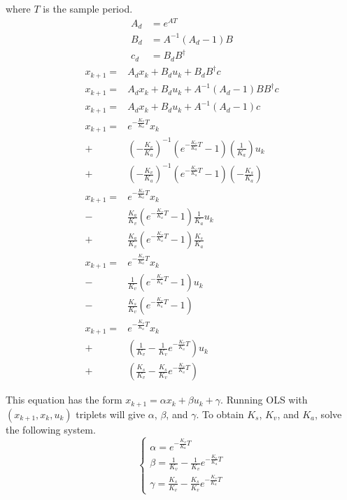 \documentclass[10pt,conference,compsoc]{IEEEtran}
\begin{document}
where $T$ is the sample period.
\begin{align*}
  A_d &= e^{AT} \\
  B_d &= A^{-1} (A_d - 1) B \\
  c_d &= B_d B^\dagger
\end{align*}
\begin{equation*}
  \begin{aligned}
    x_{k+1} =& A_d x_k + B_d u_k + B_d B^\dagger c \\
    x_{k+1} =& A_d x_k + B_d u_k + A^{-1} (A_d - 1) B B^\dagger c \\
    x_{k+1} =& A_d x_k + B_d u_k + A^{-1} (A_d - 1) c \\
    x_{k+1} =& e^{-\frac{K_v}{K_a} T} x_k \\
      +& \left(-\frac{K_v}{K_a}\right)^{-1}
        \left(e^{-\frac{K_v}{K_a} T} - 1\right)
        \left(\frac{1}{K_a}\right) u_k \\
      +& \left(-\frac{K_v}{K_a}\right)^{-1}
        \left(e^{-\frac{K_v}{K_a} T} - 1\right)
        \left(-\frac{K_s}{K_a}\right) \\
    x_{k+1} =& e^{-\frac{K_v}{K_a} T} x_k \\
      -& \frac{K_a}{K_v}
        \left(e^{-\frac{K_v}{K_a} T} - 1\right)
        \frac{1}{K_a} u_k \\
      +& \frac{K_a}{K_v}
        \left(e^{-\frac{K_v}{K_a} T} - 1\right)
        \frac{K_s}{K_a} \\
    x_{k+1} =& e^{-\frac{K_v}{K_a} T} x_k \\
      -& \frac{1}{K_v}
        \left(e^{-\frac{K_v}{K_a} T} - 1\right) u_k \\
      -& \frac{K_s}{K_v}
        \left(e^{-\frac{K_v}{K_a} T} - 1\right) \\
    x_{k+1} =& e^{-\frac{K_v}{K_a} T} x_k \\
      +& \left(\frac{1}{K_v} - \frac{1}{K_v}e^{-\frac{K_v}{K_a} T}\right) u_k \\
      +& \left(\frac{K_s}{K_v} - \frac{K_s}{K_v}e^{-\frac{K_v}{K_a} T}\right)
  \end{aligned}
\end{equation*}

This equation has the form $x_{k+1} = \alpha x_k + \beta u_k + \gamma$. Running
OLS with $(x_{k+1}, x_k, u_k)$ triplets will give $\alpha$, $\beta$, and
$\gamma$. To obtain $K_s$, $K_v$, and $K_a$, solve the following system.
\begin{equation*}
  \begin{cases}
    \alpha = e^{-\frac{K_v}{K_a} T} \\
    \beta = \frac{1}{K_v} - \frac{1}{K_v}e^{-\frac{K_v}{K_a} T} \\
    \gamma = \frac{K_s}{K_v} - \frac{K_s}{K_v}e^{-\frac{K_v}{K_a} T}
  \end{cases}
\end{equation*}
\end{document}
